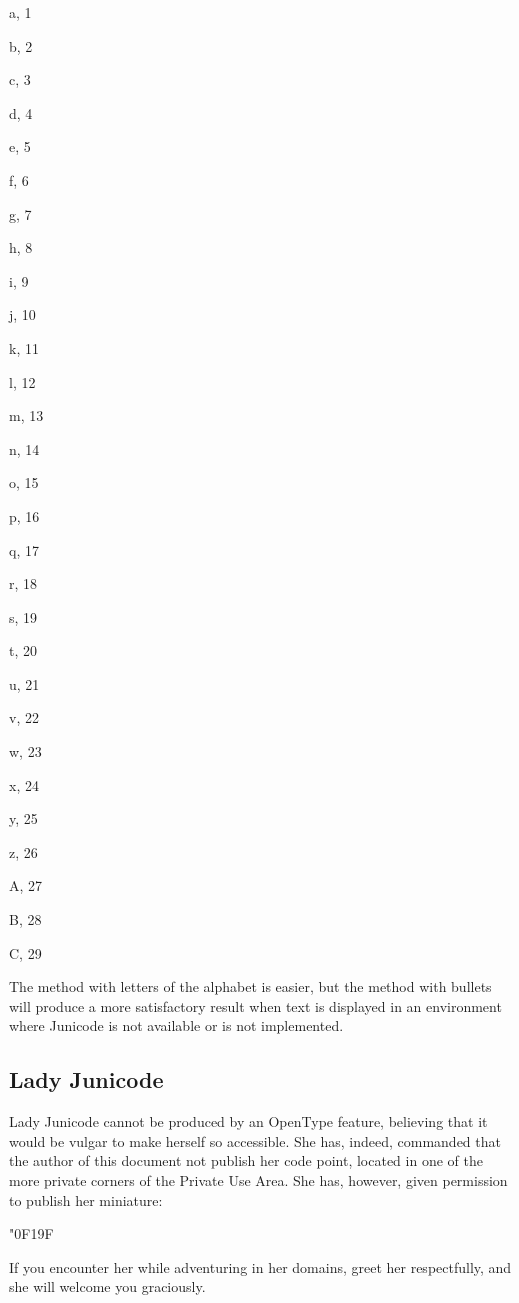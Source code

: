 \begin{multicols}{4}
a, 1{\tabto{4em}}

b, 2{\tabto{4em}}

c, 3{\tabto{4em}}

d, 4{\tabto{4em}}

e, 5{\tabto{4em}}

f, 6{\tabto{4em}}

g, 7{\tabto{4em}}

h, 8{\tabto{4em}}

i, 9{\tabto{4em}}

j, 10{\tabto{4em}}

k, 11{\tabto{4em}}

l, 12{\tabto{4em}}

m, 13{\tabto{4em}}

n, 14{\tabto{4em}}

o, 15{\tabto{4em}}

p, 16{\tabto{4em}}

q, 17{\tabto{4em}}

r, 18{\tabto{4em}}

s, 19{\tabto{4em}}

t, 20{\tabto{4em}}

u, 21{\tabto{4em}}

v, 22{\tabto{4em}}

w, 23{\tabto{4em}}

x, 24{\tabto{4em}}

y, 25{\tabto{4em}}

z, 26{\tabto{4em}}

A, 27{\tabto{4em}}

B, 28{\tabto{4em}}

C, 29{\tabto{4em}}
\end{multicols}

\noindent The method with letters of the alphabet is easier, but the method with bullets will produce a more satisfactory result
when text is displayed in an environment where Junicode is not available or  is not
implemented.

\subsection{Lady Junicode}
Lady Junicode cannot be produced by an OpenType feature, believing that it would be vulgar to make herself so accessible. She has, indeed,
commanded that the author of this document not publish her code point, located in one of the more private corners of the 
Private Use Area. She has, however, given permission to publish her miniature:
\begin{center}
{\huge\char"0F19F}
\end{center}
If you encounter her while adventuring in her domains, greet her respectfully, and she will welcome you graciously.

